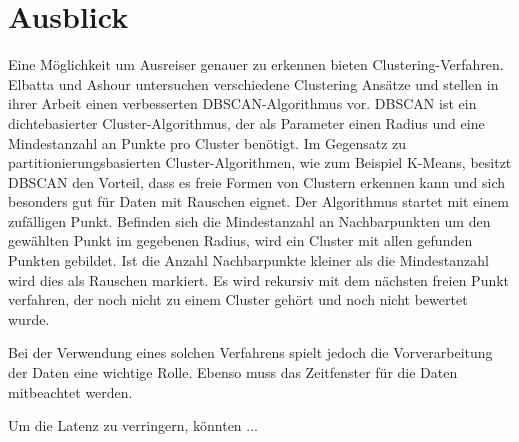 \section{Ausblick}

Eine Möglichkeit um Ausreiser genauer zu erkennen bieten Clustering-Verfahren.
Elbatta und Ashour untersuchen verschiedene Clustering Ansätze und stellen in ihrer Arbeit \cite{Elbatta2013ADM} einen verbesserten DBSCAN-Algorithmus vor.
DBSCAN ist ein  dichtebasierter Cluster-Algorithmus, der als Parameter einen Radius und eine Mindestanzahl an Punkte pro Cluster benötigt.
Im Gegensatz zu partitionierungsbasierten Cluster-Algorithmen, wie zum Beispiel K-Means, besitzt DBSCAN den Vorteil, dass es freie Formen von Clustern erkennen kann und sich besonders gut für Daten mit Rauschen eignet.
Der Algorithmus startet mit einem zufälligen Punkt.
Befinden sich die Mindestanzahl an Nachbarpunkten um den gewählten Punkt im gegebenen Radius, wird ein Cluster mit allen gefunden Punkten gebildet.
Ist die Anzahl Nachbarpunkte kleiner als die Mindestanzahl wird dies als Rauschen markiert.
Es wird rekursiv mit dem nächsten freien Punkt verfahren, der noch nicht zu einem Cluster gehört und noch nicht bewertet wurde.

Bei der Verwendung eines solchen Verfahrens spielt jedoch die Vorverarbeitung der Daten eine wichtige Rolle.
Ebenso muss das Zeitfenster für die Daten mitbeachtet werden.

Um die Latenz zu verringern, könnten ...
